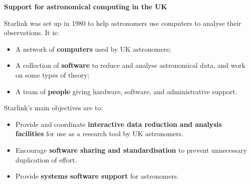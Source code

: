 \documentclass[twoside,11pt]{article}
\newenvironment{latexonly}{}{}
\newcommand{\html}[1]{}
\newcommand{\xlabel}[1]{}
\renewcommand{\thepage}{\roman{page}}
\begin{document}
\renewcommand{\thepage}{\arabic{page}}
\setcounter{page}{1}

\html{\section{\xlabel{support}Support for astronomical computing in
the UK}}
\begin{latexonly}
\begin{center}
{\large\bf Support for astronomical computing in the UK}
\end{center}
\end{latexonly}

\vspace*{5mm}
\html{\normalsize\rm}
Starlink was set up in 1980 to help astronomers use computers to analyse their
observations.
It is:

\begin{itemize}
\item A network of {\bf computers} used by UK astronomers; 
\item A collection of {\bf software} to reduce and analyse astronomical data,
and work on some types of theory;
\item A team of {\bf people} giving hardware, software, and administrative
support. 
\end{itemize}

Starlink's main objectives are to:

\begin{itemize}
\item Provide and coordinate 
{\bf interactive data reduction and analysis facilities} for use as a 
research tool by UK astronomers.
\item Encourage {\bf software sharing and standardisation} to prevent
unnecessary duplication of effort.
\item Provide {\bf systems software support} for astronomers.
\end{itemize}
\end{document}
